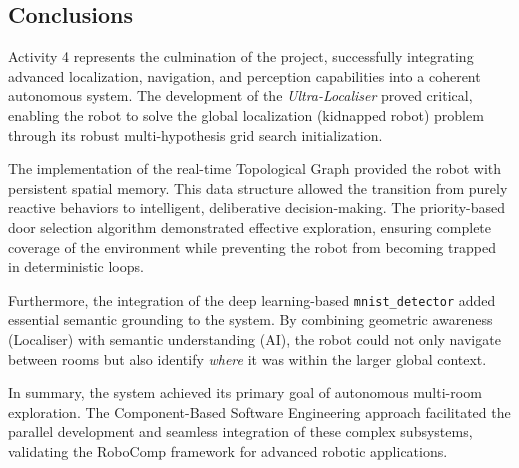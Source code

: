 \documentclass[conference]{IEEEtran}
\begin{document}
    \subsection{Conclusions}
    Activity 4 represents the culmination of the project, successfully integrating advanced localization, navigation, and perception capabilities into a coherent autonomous system. The development of the \textit{Ultra-Localiser} proved critical, enabling the robot to solve the global localization (kidnapped robot) problem through its robust multi-hypothesis grid search initialization.
    
    The implementation of the real-time Topological Graph provided the robot with persistent spatial memory. This data structure allowed the transition from purely reactive behaviors to intelligent, deliberative decision-making. The priority-based door selection algorithm demonstrated effective exploration, ensuring complete coverage of the environment while preventing the robot from becoming trapped in deterministic loops.
    
    Furthermore, the integration of the deep learning-based \texttt{mnist\_detector} added essential semantic grounding to the system. By combining geometric awareness (Localiser) with semantic understanding (AI), the robot could not only navigate between rooms but also identify \textit{where} it was within the larger global context.
    
    In summary, the system achieved its primary goal of autonomous multi-room exploration. The Component-Based Software Engineering approach facilitated the parallel development and seamless integration of these complex subsystems, validating the RoboComp framework for advanced robotic applications.
\end{document}

